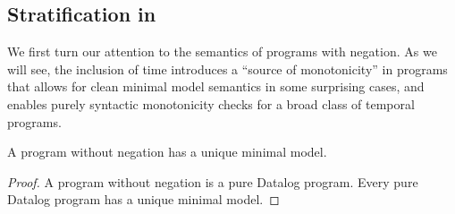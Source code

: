 
\subsection{Stratification in {\large{\bf\slang}}}

We first turn our attention to the semantics of
programs with negation.  As we will see, the inclusion of time introduces a
``source of monotonicity'' in programs that allows for clean minimal model
semantics in some surprising cases, and enables purely syntactic monotonicity
checks for a broad class of temporal programs.




\begin{lemma} \label{lemma:no-neg-unique}
%
A \slang program without negation 
has a unique minimal model.
%
\end{lemma}

\begin{proof} 
%
A \slang program without negation 
is a pure Datalog
program.  Every pure Datalog program has a unique minimal model. 
%
\end{proof}


